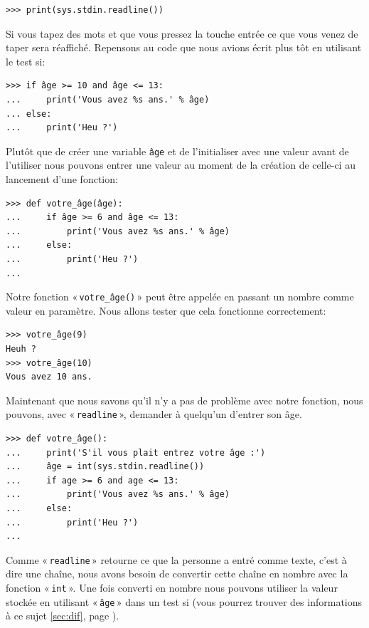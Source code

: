 \begin{Verbatim}[frame=single,rulecolor=\color{mbleu}, label=à taper]
>>> print(sys.stdin.readline())
\end{Verbatim}

Si vous tapez des mots et que vous pressez la touche entrée ce que vous venez de taper sera réaffiché. Repensons au code que nous avions écrit plus tôt en utilisant le test si:

\begin{Verbatim}[frame=single,rulecolor=\color{gray}, label=ne pas saisir]
>>> if âge >= 10 and âge <= 13:
...     print('Vous avez %s ans.' % âge)
... else:
...     print('Heu ?')
\end{Verbatim}

Plutôt que de créer une variable \texttt{âge} et de l'initialiser avec une valeur avant de l'utiliser nous pouvons  entrer une valeur au moment de la création de celle-ci au lancement d'une fonction:

\begin{Verbatim}[frame=single,rulecolor=\color{mbleu}, label=à taper]
>>> def votre_âge(âge):
...     if âge >= 6 and âge <= 13:
...         print('Vous avez %s ans.' % âge)
...     else:
...         print('Heu ?')
...
\end{Verbatim}

Notre fonction « \texttt{votre\_âge()} » peut être appelée en passant un nombre comme valeur en paramètre. Nous allons tester que cela fonctionne correctement: 

\begin{Verbatim}[frame=single,rulecolor=\color{mbleu}, label=à taper]
>>> votre_âge(9)
Heuh ?
>>> votre_âge(10)
Vous avez 10 ans.
\end{Verbatim}

Maintenant que nous savons qu'il n'y a pas de problème avec notre fonction, nous pouvons,
avec « \texttt{readline} », demander à quelqu'un d'entrer son âge.


\begin{Verbatim}[frame=single,rulecolor=\color{mbleu}, label=à taper]
>>> def votre_âge():
...     print('S'il vous plait entrez votre âge :')
...     âge = int(sys.stdin.readline())
...     if age >= 6 and age <= 13:
...         print('Vous avez %s ans.' % âge)
...     else:
...         print('Heu ?')
...
\end{Verbatim}

Comme « \texttt{readline} » retourne ce que la personne a entré comme texte, c'est à dire une chaîne, nous avons besoin de convertir cette chaîne en nombre avec la fonction « \texttt{int} ». Une fois converti en nombre nous pouvons utiliser la valeur stockée en utilisant « \texttt{âge} » dans un test si (vous pourrez trouver des informations à ce sujet \autoref{sec:dif}, page \pageref{sec:dif}).


